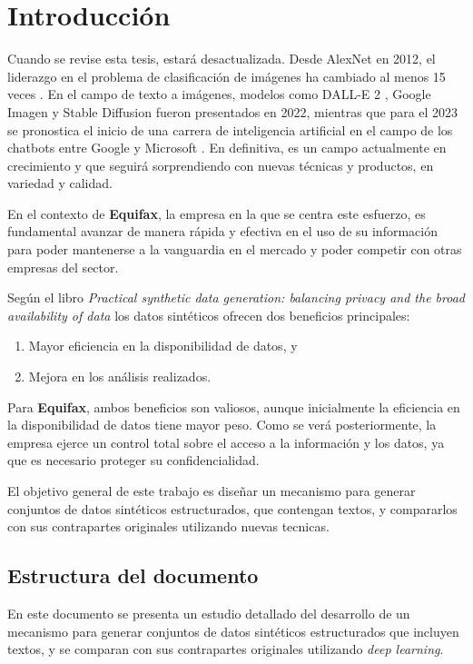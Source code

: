 \chapter{Introducción}
Cuando se revise esta tesis, estará desactualizada. Desde AlexNet \cite{krizhevsky_imagenet_2012} en 2012, el liderazgo en el problema de clasificación de imágenes ha cambiado al menos 15 veces \cite{noauthor_papers_nodate}. En el campo de texto a imágenes, modelos como DALL-E 2 \cite{noauthor_dalle_nodate}, Google Imagen \cite{noauthor_imagen_nodate} y Stable Diffusion \cite{noauthor_stable_nodate} fueron presentados en 2022, mientras que para el 2023 se pronostica el inicio de una carrera de inteligencia artificial en el campo de los chatbots entre Google y Microsoft \cite{milmo_google_2023, noauthor_microsoft_2023}. En definitiva, es un campo actualmente en crecimiento y que seguirá sorprendiendo con nuevas técnicas y productos, en variedad y calidad.

En el contexto de \textbf{Equifax}, la empresa en la que se centra este esfuerzo, es fundamental avanzar de manera rápida y efectiva en el uso de su información para poder mantenerse a la vanguardia en el mercado y poder competir con otras empresas del sector.

Según el libro \emph{Practical synthetic data generation: balancing privacy and the broad availability of data} \cite{el_emam_practical_2020} los datos sintéticos ofrecen dos beneficios principales:
\begin{enumerate}
    \item Mayor eficiencia en la disponibilidad de datos, y
    \item Mejora en los análisis realizados.
\end{enumerate}

Para \textbf{Equifax}, ambos beneficios son valiosos, aunque inicialmente la eficiencia en la disponibilidad de datos tiene mayor peso. Como se verá posteriormente, la empresa ejerce un control total sobre el acceso a la información y los datos, ya que es necesario proteger su confidencialidad.

El objetivo general de este trabajo es diseñar un mecanismo para generar conjuntos de datos sintéticos estructurados, que contengan textos, y compararlos con sus contrapartes originales utilizando nuevas tecnicas.

\section{Estructura del documento}
En este documento se presenta un estudio detallado del desarrollo de un mecanismo para generar conjuntos de datos sintéticos estructurados que incluyen textos, y se comparan con sus contrapartes originales utilizando \emph{deep learning}.

